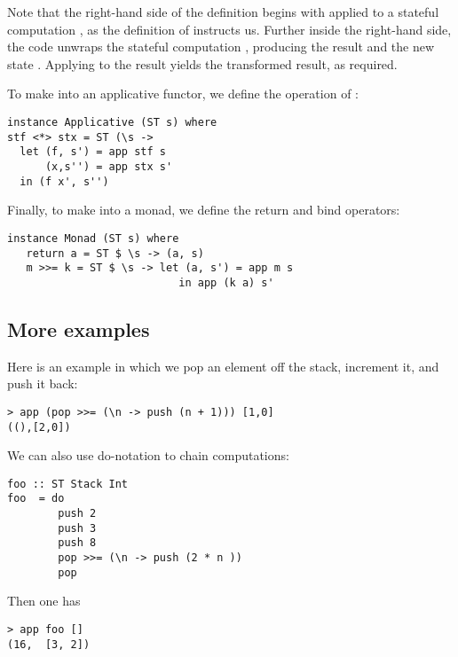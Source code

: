 Note that the right-hand side of the definition begins with  applied to a stateful computation , as the definition of  instructs us. Further inside the right-hand side, the code  unwraps the stateful computation , producing the result  and the new state .  Applying  to the result yields the transformed result, as required.


To make  into an applicative functor, we define the operation of \code{(<*>)}:

\begin{verbatim}
instance Applicative (ST s) where
stf <*> stx = ST (\s ->
  let (f, s') = app stf s
      (x,s'') = app stx s'
  in (f x', s'')
\end{verbatim}

Finally, to make   into a monad, we define the return and bind operators:

\begin{verbatim}
instance Monad (ST s) where
   return a = ST $ \s -> (a, s)
   m >>= k = ST $ \s -> let (a, s') = app m s
                           in app (k a) s'
\end{verbatim}


\subsection{More examples}

Here is an example in which we pop an element off the stack, increment it, and push it back:

\begin{verbatim}
> app (pop >>= (\n -> push (n + 1))) [1,0]
((),[2,0])
\end{verbatim}

We can also use do-notation to chain computations:

\begin{verbatim}
foo :: ST Stack Int
foo  = do
        push 2
        push 3
        push 8
        pop >>= (\n -> push (2 * n ))
        pop
\end{verbatim}

Then one has

\begin{verbatim}
> app foo []
(16,  [3, 2])
\end{verbatim}

\bigskip
{}

